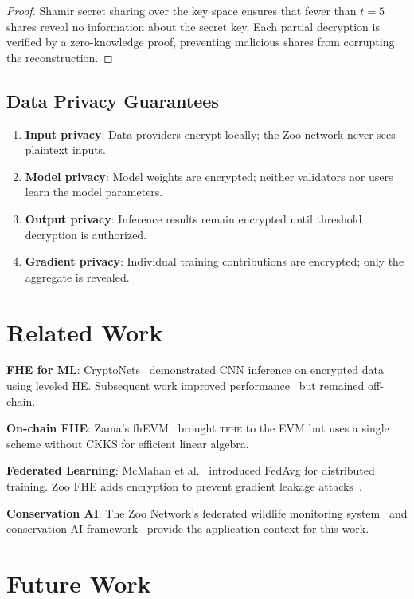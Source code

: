 \documentclass[11pt,letterpaper]{article}
\newcommand{\TFHE}{\textsc{tfhe}}
\begin{document}
\begin{proof}
Shamir secret sharing over the key space ensures that fewer than $t = 5$ shares reveal no information about the secret key. Each partial decryption is verified by a zero-knowledge proof, preventing malicious shares from corrupting the reconstruction.
\end{proof}

\subsection{Data Privacy Guarantees}

\begin{enumerate}
    \item \textbf{Input privacy}: Data providers encrypt locally; the Zoo network never sees plaintext inputs.
    \item \textbf{Model privacy}: Model weights are encrypted; neither validators nor users learn the model parameters.
    \item \textbf{Output privacy}: Inference results remain encrypted until threshold decryption is authorized.
    \item \textbf{Gradient privacy}: Individual training contributions are encrypted; only the aggregate is revealed.
\end{enumerate}

\section{Related Work}

\textbf{FHE for ML}: CryptoNets~\cite{gilad2016cryptonets} demonstrated CNN inference on encrypted data using leveled HE. Subsequent work improved performance~\cite{brutzkus2019low} but remained off-chain.

\textbf{On-chain FHE}: Zama's fhEVM~\cite{lux-fhevm} brought \TFHE{} to the EVM but uses a single scheme without CKKS for efficient linear algebra.

\textbf{Federated Learning}: McMahan et al.~\cite{mcmahan2017communication} introduced FedAvg for distributed training. Zoo FHE adds encryption to prevent gradient leakage attacks~\cite{zhu2019deep}.

\textbf{Conservation AI}: The Zoo Network's federated wildlife monitoring system~\cite{zoo-federated-wildlife} and conservation AI framework~\cite{zoo-conservation-ai} provide the application context for this work.

\section{Future Work}
\end{document}
